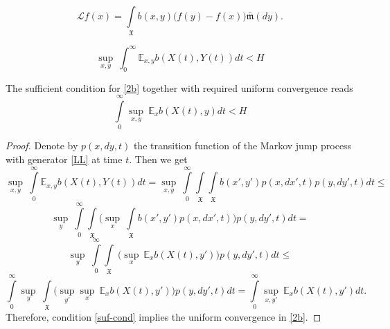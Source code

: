 \documentclass[10pt,a4paper]{amsart}
\newcommand{\XXX}{{\mathfrak{X}}}
\begin{document}
\begin{equation}\label{LL}
\mathcal{L} f(x) =  \int\limits_{\XXX} b(x,y) \big( f(y) - f(x) \big)  \bar{\mathfrak{m}}(dy).
\end{equation}

\begin{equation}\label{2b}
\sup\limits_{x,y} \ \int_{0}^{\infty} \mathbb{E}_{x,y} b(X(t), Y(t)) dt < H
\end{equation}

\begin{remark}\label{R2}
The sufficient condition for \eqref{2b} together with required uniform convergence reads
\begin{equation}\label{suf-cond}
\int\limits_0^{\infty}  \sup\limits_{x, y} \ \mathbb{E}_x b(X(t), y) dt < H
\end{equation}
\end{remark}

\begin{proof} Denote by  $p (x,dy,t)$ the transition function of the Markov jump process with generator \eqref{LL} at time $t$. Then we get
$$
\sup\limits_{x,y} \ \int\limits_{0}^{\infty} \mathbb{E}_{x,y} b(X(t), Y(t)) dt =
\sup\limits_{x,y} \ \int\limits_0^{\infty} \int\limits_{\XXX} \int\limits_{\XXX} b(x', y') p(x, dx',t) p(y, dy',t) dt \le
$$
$$
\sup\limits_{y} \ \int\limits_0^{\infty} \int\limits_{\XXX}  \Big( \sup\limits_{x} \  \int\limits_{\XXX}  b(x', y') p(x, dx', t) \Big)  p(y, dy',t)  dt =
$$
$$
\sup\limits_{y} \ \int\limits_0^{\infty}  \int\limits_{\XXX}  \ \Big( \sup\limits_{x} \ \mathbb{E}_x b(X(t), y')  \Big)  p(y, dy',t) dt \le
$$
$$
\int\limits_0^{\infty} \sup\limits_{y} \ \int\limits_{\XXX}  \Big( \sup\limits_{y'} \sup\limits_{x} \ \mathbb{E}_x b(X(t), y') \Big)  p(y, dy',t) dt =
\int\limits_0^{\infty}  \sup\limits_{x, y'} \ \mathbb{E}_x b(X(t), y') dt.
$$
Therefore, condition \eqref{suf-cond} implies the uniform convergence in \eqref{2b}.
\end{proof}
\end{document}
